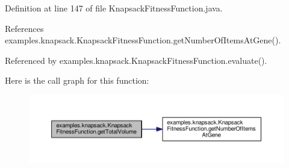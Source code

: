 Definition at line 147 of file Knapsack\-Fitness\-Function.\-java.



References examples.\-knapsack.\-Knapsack\-Fitness\-Function.\-get\-Number\-Of\-Items\-At\-Gene().



Referenced by examples.\-knapsack.\-Knapsack\-Fitness\-Function.\-evaluate().



Here is the call graph for this function\-:
\nopagebreak
\begin{figure}[H]
\begin{center}
\leavevmode
\includegraphics[width=350pt]{classexamples_1_1knapsack_1_1_knapsack_fitness_function_a161d2eb9b204b94ad6f764055905c559_cgraph}
\end{center}
\end{figure}


